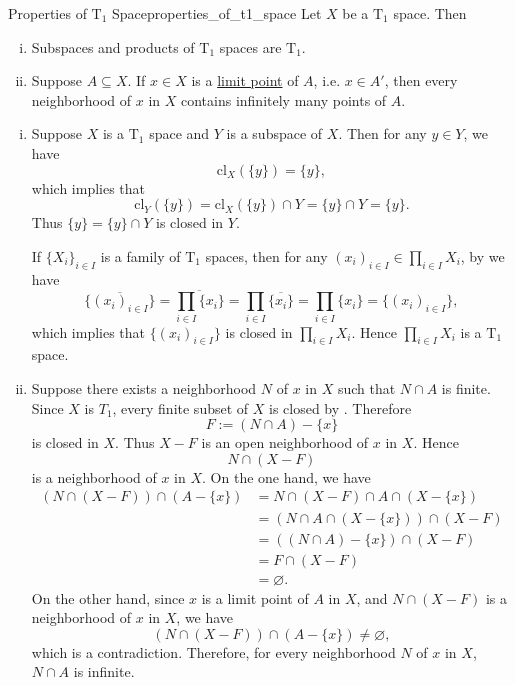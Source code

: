 \documentclass{report}
\begin{document}
\begin{proposition}{Properties of $\mathrm{T}_1$ Space}{properties_of_t1_space}
	Let $X$ be a $\mathrm{T}_1$ space. Then
	\begin{enumerate}[(i)]
		\item Subspaces and products of $\mathrm{T}_1$ spaces are $\mathrm{T}_1$.
		\item Suppose \(A\subseteq X\). If \(x\in X\) is a \hyperref[th:limit_point]{limit point} of \(A\), i.e. $x\in A'$, then every neighborhood of \(x\) in $X$ contains infinitely many points of \(A\).
	\end{enumerate}
\end{proposition}
\begin{prf}
	\begin{enumerate}[(i)]
		\item Suppose $X$ is a $\mathrm{T}_1$ space and $Y$ is a subspace of $X$. Then for any $y\in Y$, we have
		\[
		\mathrm{cl}_X(\{y\})=\{y\},
		\]
		which implies that
		\[
        \mathrm{cl}_Y(\{y\})=\mathrm{cl}_X(\{y\})\cap Y=\{y\}\cap Y=\{y\}.
		\]
		Thus
		$\{y\}=\{y\}\cap Y$ is closed in $Y$. 
		
		If $\{X_i\}_{i\in I}$ is a family of $\mathrm{T}_1$ spaces, then for any $(x_i)_{i\in I}\in \prod_{i\in I}X_i$, by  we have
        \[
		 \overline{\{(x_i)_{i\in I}\}}=\overline{\prod_{i\in I}\{x_i\}}=\prod_{i\in I}\overline{\{x_i\}}=\prod_{i\in I}\{x_i\}=\{(x_i)_{i\in I}\},
		\]
		which implies that $\{(x_i)_{i\in I}\}$ is closed in $\prod_{i\in I}X_i$. Hence $\prod_{i\in I}X_i$ is a $\mathrm{T}_1$ space.

		\item 
		Suppose there exists a neighborhood \(N\) of \(x\) in \(X\) such
		that \(N\cap A\) is finite. Since \(X\) is \(T_1\), every finite subset of \(X\) is
		closed by . Therefore
		\[
			F:=(N\cap A)-\{x\}
		\]
		is closed in \(X\). Thus $X-F$ is an open neighborhood of \(x\) in \(X\). Hence
		\[
			N\cap (X - F)
		\]
		is a neighborhood of \(x\) in \(X\). On the one hand, we have
		\[
		\begin{aligned}
		\left(N\cap (X-F)\right)\cap (A-\{x\})
		&=N\cap (X-F)\cap A\cap (X-\{x\})\\
		&=(N\cap A\cap (X-\{x\}))\cap (X-F)\\
		&=((N\cap A)-\{x\})\cap (X-F)\\
		&=F\cap (X-F)\\
		&=\varnothing.
		\end{aligned}
		\]
		On the other hand, since \(x\) is a limit point of \(A\) in
		\(X\), and \(N\cap (X-F)\) is a neighborhood of \(x\) in \(X\), we have
		\[
			\left(N\cap (X-F)\right)\cap (A-\{x\})\ne \varnothing,
		\]
		which is a contradiction. Therefore, for every neighborhood \(N\) of \(x\) in \(X\), \(N\cap A\) is infinite.
	\end{enumerate}
\end{prf}
\end{document}
